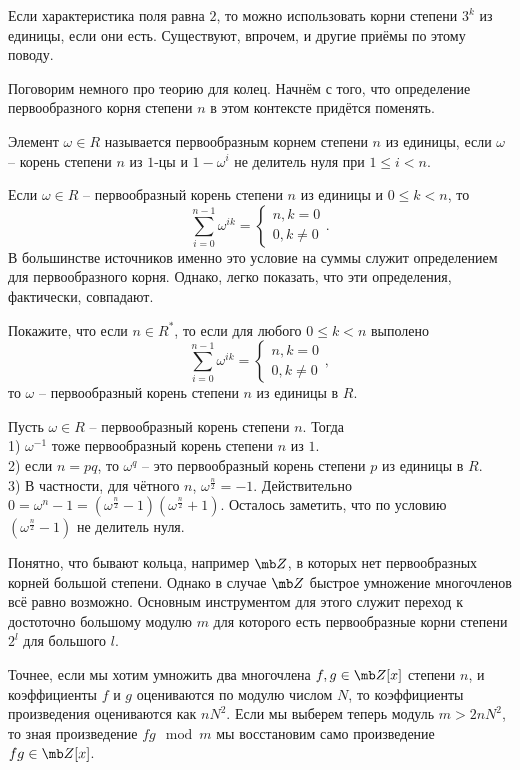 Если характеристика поля равна $2$, то можно использовать корни степени $3^k$ из единицы, если они есть. Существуют, впрочем, и другие приёмы по этому поводу.


Поговорим немного про теорию для колец. Начнём с того, что определение первообразного корня степени $n$ в этом контексте придётся поменять.



\dfn Элемент  $\omega \in R$ называется первообразным корнем  степени $n$ из единицы, если $\omega$ -- корень степени $n$ из $1$-цы и $1-\omega^i$ не делитель нуля при $1\leq i< n$.
\edfn

\rm Если $\omega \in R$ -- первообразный корень степени $n$ из единицы  и $0\leq k < n$, то 
$$\sum_{i=0}^{n-1}\omega^{ik}=\begin{cases} n, k=0\\
0, k\neq 0
\end{cases}.$$
В большинстве источников именно это условие на суммы служит определением для первообразного корня. Однако, легко показать, что эти определения, фактически, совпадают.
\erm

\upr Покажите, что если $n \in R^*$, то если для любого  $0\leq k < n$ выполено
$$\sum_{i=0}^{n-1}\omega^{ik}=\begin{cases} n, k=0\\
0, k\neq 0
\end{cases},$$
то $\omega$ -- первообразный корень степени $n$ из единицы в $R$.
\eupr

\rm Пусть $\omega \in R$ -- первообразный корень степени $n$. Тогда\\
1) $\omega^{-1}$ тоже первообразный корень степени $n$ из $1$.\\
2) если $n=pq$, то $\omega^q$ -- это первообразный корень степени $p$ из единицы в $R$.\\
3) В частности, для чётного $n$, $\omega^{\frac{n}{2}}=-1$. Действительно $0=\omega^n-1=(\omega^{\frac{n}{2}}-1)(\omega^{\frac{n}{2}}+1)$. Осталось заметить, что по условию $(\omega^{\frac{n}{2}}-1)$ не делитель нуля.
\erm

Понятно, что бывают кольца, например $\mb Z$, в которых нет первообразных корней большой степени. Однако в случае $\mb Z$ быстрое умножение многочленов всё равно возможно. Основным инструментом для этого служит переход к достоточно большому модулю $m$ для которого есть первообразные корни степени $2^l$ для большого $l$.

Точнее, если мы хотим умножить два многочлена $f,g\in \mb Z[x]$ степени $n$, и коэффициенты $f$ и $g$ оцениваются по модулю числом $N$, то коэффициенты произведения оцениваются как $nN^2$. Если мы выберем теперь модуль $m >2nN^2$, то зная произведение $fg \mod m$ мы восстановим само произведение $fg \in \mb Z[x]$. 

